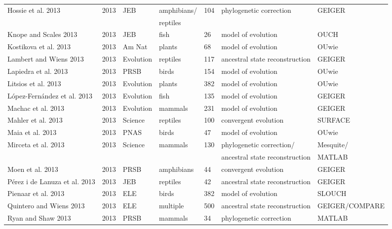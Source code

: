 \documentclass[a4paper,12pt]{article}
\begin{document}
\begin{landscape}
\begin{center}
\begin{longtable}{p{6cm}llllll}
Hossie et al. 2013    &   2013    &   JEB &   amphibians/ &   104 &   phylogenetic correction &   GEIGER  \\
    &       &       &   reptiles    &       &       &       \\
Knope and Scales 2013 &   2013    &   JEB &   fish    &   26  &   model of evolution  &   OUCH    \\
Kostikova et al. 2013 &   2013    &   Am Nat  &   plants  &   68  &   model of evolution  &   OUwie   \\
Lambert and Wiens 2013    &   2013    &   Evolution   &   reptiles    &   117 &   ancestral state reconstruction  &   GEIGER  \\
Lapiedra et al. 2013  &   2013    &   PRSB    &   birds   &   154 &   model of evolution  &   OUwie   \\
Litsios et al. 2013   &   2013    &   Evolution   &   plants  &   382 &   model of evolution  &   OUwie   \\
L\'{o}pez-Fern\'{a}ndez et al. 2013   &   2013    &   Evolution   &   fish    &   135 &   model of evolution  &   GEIGER  \\
Machac et al. 2013    &   2013    &   Evolution   &   mammals &   231 &   model of evolution  &   GEIGER  \\
Mahler et al. 2013    &   2013    &   Science &   reptiles    &   100 &   convergent evolution    &   SURFACE \\
Maia et al. 2013  &   2013    &   PNAS    &   birds   &   47  &   model of evolution  &   OUwie   \\
Mirceta et al. 2013   &   2013    &   Science &   mammals &   130 &   phylogenetic correction/    &   Mesquite/   \\
    &       &       &       &       &   ancestral state reconstruction  &   MATLAB  \\
Moen et al. 2013  &   2013    &   PRSB    &   amphibians  &   44  &   convergent evolution    &   GEIGER  \\
P\'{e}rez i de Lanuza et al. 2013 &   2013    &   JEB &   reptiles    &   42  &   ancestral state reconstruction  &   GEIGER  \\
Pienaar et al. 2013   &   2013    &   ELE &   birds   &   382 &   model of evolution  &   SLOUCH  \\
Quintero and Wiens 2013   &   2013    &   ELE &   multiple    &   500 &   ancestral state reconstruction  &   GEIGER/COMPARE  \\
Ryan and Shaw 2013    &   2013    &   PRSB    &   mammals &   34  &   phylogenetic correction &   MATLAB  \\

\end{longtable}
\end{center}
\end{landscape}
\end{document}
